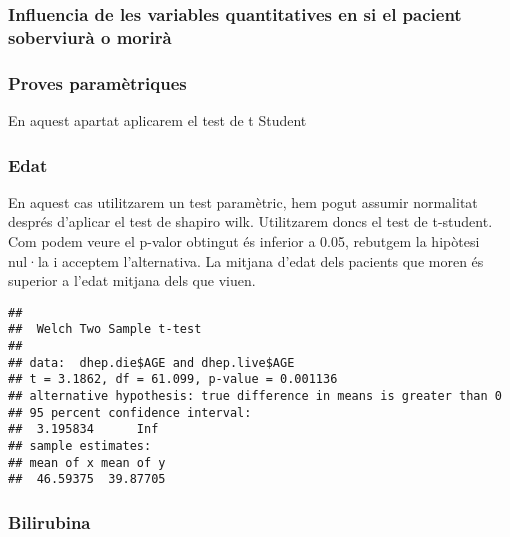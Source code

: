 \documentclass[]{article}
\newenvironment{Shaded}{\begin{snugshade}}{\end{snugshade}}
\newcommand{\DataTypeTok}[1]{\textcolor[rgb]{0.13,0.29,0.53}{#1}}
\newcommand{\KeywordTok}[1]{\textcolor[rgb]{0.13,0.29,0.53}{\textbf{#1}}}
\newcommand{\NormalTok}[1]{#1}
\newcommand{\OperatorTok}[1]{\textcolor[rgb]{0.81,0.36,0.00}{\textbf{#1}}}
\newcommand{\StringTok}[1]{\textcolor[rgb]{0.31,0.60,0.02}{#1}}
\begin{document}
\hypertarget{influencia-de-les-variables-quantitatives-en-si-el-pacient-soberviuruxe0-o-moriruxe0}{%
\subsubsection{Influencia de les variables quantitatives en si el
pacient soberviurà o
morirà}\label{influencia-de-les-variables-quantitatives-en-si-el-pacient-soberviuruxe0-o-moriruxe0}}

\hypertarget{proves-paramuxe8triques}{%
\subsubsection{Proves paramètriques}\label{proves-paramuxe8triques}}

En aquest apartat aplicarem el test de t Student

\hypertarget{edat}{%
\subsubsection{Edat}\label{edat}}

En aquest cas utilitzarem un test paramètric, hem pogut assumir
normalitat després d'aplicar el test de shapiro wilk. Utilitzarem doncs
el test de t-student.\\
Com podem veure el p-valor obtingut és inferior a 0.05, rebutgem la
hipòtesi nul·la i acceptem l'alternativa. La mitjana d'edat dels
pacients que moren és superior a l'edat mitjana dels que viuen.

\begin{Shaded}
\end{Shaded}

\begin{verbatim}
## 
##  Welch Two Sample t-test
## 
## data:  dhep.die$AGE and dhep.live$AGE
## t = 3.1862, df = 61.099, p-value = 0.001136
## alternative hypothesis: true difference in means is greater than 0
## 95 percent confidence interval:
##  3.195834      Inf
## sample estimates:
## mean of x mean of y 
##  46.59375  39.87705
\end{verbatim}

\hypertarget{bilirubina}{%
\subsubsection{Bilirubina}\label{bilirubina}}
\end{document}
